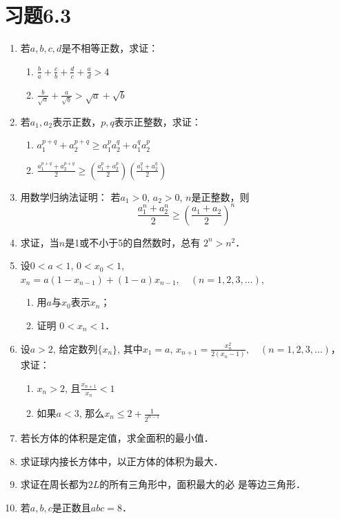 \section*{习题6.3}

\begin{enumerate}
   \item  若$a,b,c,d$是不相等正数，求证：
\begin{enumerate}
    \item $\frac{b}{a}+\frac{c}{b}+\frac{d}{c}+\frac{a}{d}>4$
    \item $\frac{b}{\sqrt{a}}+\frac{a}{\sqrt{b}}>\sqrt{a}+\sqrt{b}$
\end{enumerate}
   \item  若$a_1,a_2$表示正数，$p,q$表示正整数，求证：
\begin{enumerate}
    \item $a_1^{p+q}+a_2^{p+q}\ge a_1^pa_2^q+a_1^qa_2^p$
    \item $\frac{a_1^{p+q}+a_2^{p+q}}{2}\ge \left(\frac{a_1^p+a_2^p}{2}\right)\left(\frac{a_1^q+a_2^q}{2}\right)$
\end{enumerate}

\item 用数学归纳法证明：
若$a_1>0$, $a_2>0$, $n$是正整数，则
\[\frac{a_1^n+a_2^n}{2}\ge \left(\frac{a_1+a_2}{2}\right)^n\]
\item 求证，当$n$是1或不小于5的自然数时，总有
$2^n>n^2$．
\item 设$0<a<1$, $0<x_0<1$, $x_n=a(1-x_{n-1})+
(1-a)x_{n-1},\quad (n=1,2,3,\ldots)$,
\begin{enumerate}
    \item 用$a$与$x_0$表示$x_n$；
    \item 证明 $0<x_n<1$．
\end{enumerate}

\item 设$a>2$, 给定数列$\{x_n\}$, 其中$x_1=a$, $x_{n+1}=\frac{x^2_n}{2(x_n-1)},\quad (n=1,2,3,\ldots)$，
求证：
\begin{enumerate}
    \item $x_n>2$, 且$\frac{x_{n+1}}{x_n}<1$
\item 如果$a<3$, 那么$x_n\le 2+\frac{1}{2^{n-1}}$
\end{enumerate}

\item 若长方体的体积是定值，求全面积的最小值．
\item 求证球内接长方体中，以正方体的体积为最大．
\item 求证在周长都为$2L$的所有三角形中，面积最大的必
是等边三角形．
\item 若$a,b,c$是正数且$abc=8$．


\end{enumerate}

